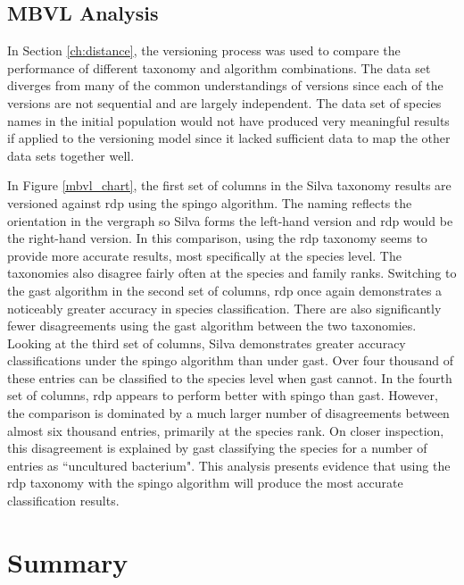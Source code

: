 \subsection{MBVL Analysis}

In Section \ref{ch:distance}, the versioning process was used to compare the performance of different taxonomy and algorithm combinations.
The data set diverges from many of the common understandings of \glspl{version} since each of the \glspl{version} are not sequential and are largely independent.
The data set of species names in the initial population would not have produced very meaningful results if applied to the versioning model since it lacked sufficient data to map the other data sets together well.

In Figure \ref{mbvl_chart}, the first set of columns in the Silva taxonomy results are versioned against \gls{rdp} using the \gls{spingo} algorithm.
The naming reflects the orientation in the \gls{vergraph} so Silva forms the left-hand version and \gls{rdp} would be the right-hand \gls{version}.
In this comparison, using the \gls{rdp} taxonomy seems to provide more accurate results, most specifically at the species level.
The taxonomies also disagree fairly often at the species and family ranks.
Switching to the \gls{gast} algorithm in the second set of columns, \gls{rdp} once again demonstrates a noticeably greater accuracy in species classification.
There are also significantly fewer disagreements using the \gls{gast} algorithm between the two taxonomies.
Looking at the third set of columns, Silva demonstrates greater accuracy classifications under the \gls{spingo} algorithm than under \gls{gast}.
Over four thousand of these entries can be classified to the species level when \gls{gast} cannot.
In the fourth set of columns, \gls{rdp} appears to perform better with \gls{spingo} than \gls{gast}.
However, the comparison is dominated by a much larger number of disagreements between almost six thousand entries, primarily at the species rank.
On closer inspection, this disagreement is explained by \gls{gast} classifying the species for a number of entries as ``uncultured bacterium".
This analysis presents evidence that using the \gls{rdp} taxonomy with the \gls{spingo} algorithm will produce the most accurate classification results.

\section{Summary}

